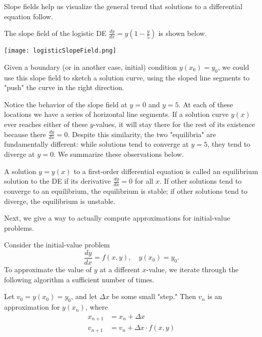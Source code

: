 \documentclass[../m82main.tex]{subfiles}
\begin{document}
Slope fields help us visualize the general trend that solutions to a differential equation follow.

\begin{example}
    The slope field of the logistic DE $\displaystyle \frac{dy}{dx} = y\left( 1 - \frac{y}{5} \right)$ is shown below.
    \begin{center}
        \texttt{[image: logisticSlopeField.png]}
    \end{center}
    Given a boundary (or in another case, initial) condition $y(x_0) = y_0$, we could use this slope field to sketch a solution curve, using the sloped line segments to "push" the curve in the right direction.
\end{example}

Notice the behavior of the slope field at $y = 0$ and $y = 5$.
At each of these locations we have a series of horizontal line segments.
If a solution curve $y(x)$ ever reaches either of these $y$-values, it will stay there for the rest of its existence because there $\frac{dy}{dx} = 0$.
Despite this similarity, the two "equilibria" are fundamentally different: while solutions tend to converge at $y = 5$, they tend to diverge at $y = 0$.
We summarize these observations below.

\begin{definition}
    A solution $y = y(x)$ to a first-order differential equation is called an equilibrium solution to the DE if its derivative $\frac{dy}{dx} = 0$ for all $x$.
    If other solutions tend to converge to an equilibrium, the equilibrium is stable; if other solutions tend to diverge, the equilibrium is unstable.
\end{definition}

Next, we give a way to actually compute approximations for initial-value problems.

\begin{definition}
    Consider the initial-value problem
    \[ \frac{dy}{dx} = f(x, y), \quad y(x_0) = y_0. \]
    To approximate the value of $y$ at a different $x$-value, we iterate through the following algorithm a sufficient number of times.

    Let $v_0 = y(x_0) = y_0$, and let $\Delta x$ be some small "step."
    Then $v_n$ is an approximation for $y(x_n)$, where
    \begin{align*}
        x_{n+1} &= x_n + \Delta x \\
        v_{n+1} &= v_n + \Delta x \cdot f(x, y)
    \end{align*}
    
\end{definition}
\end{document}
